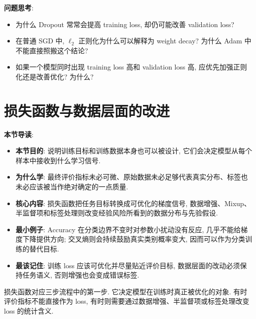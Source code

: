 \documentclass{../nndlcourse}
\begin{document}
\textbf{问题思考}:
\begin{itemize}
  \item 为什么 Dropout 常常会提高 training loss, 却仍可能改善 validation loss?
  \item 在普通 SGD 中, $\ell_2$ 正则化为什么可以解释为 weight decay? 为什么 Adam 中不能直接照搬这个结论?
  \item 如果一个模型同时出现 training loss 高和 validation loss 高, 应优先加强正则化还是改善优化? 为什么?
\end{itemize}


\section{损失函数与数据层面的改进}

\textbf{本节导读}:
\begin{itemize}
  \item \textbf{本节目的}: 说明训练目标和训练数据本身也可以被设计, 它们会决定模型从每个样本中接收到什么学习信号.
  \item \textbf{为什么学}: 最终评价指标未必可微、原始数据未必足够代表真实分布、标签也未必应该被当作绝对确定的一点质量.
  \item \textbf{核心内容}: 损失函数把任务目标转换成可优化的梯度信号, 数据增强、Mixup、半监督项和标签处理则改变经验风险所看到的数据分布与先验假设.
  \item \textbf{最小例子}: Accuracy 在分类边界不变时对参数小扰动没有反应, 几乎不能给梯度下降提供方向; 交叉熵则会持续鼓励真实类别概率变大, 因而可以作为分类训练的替代目标.
  \item \textbf{最该记住}: 训练 loss 应该可优化并尽量贴近评价目标, 数据层面的改动必须保持任务语义, 否则增强也会变成错误标签.
\end{itemize}

损失函数对应三步流程中的第一步. 它决定模型在训练时真正被优化的对象. 有时评价指标不能直接作为 loss, 有时则需要通过数据增强、半监督项或标签处理改变 loss 的统计含义.
\end{document}
